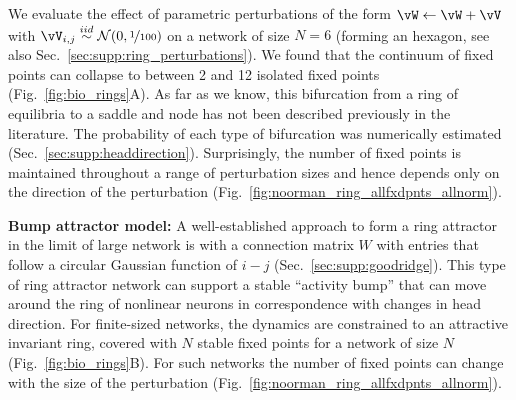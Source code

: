 \documentclass{article} %
\newcommand{\ptitle}[1]{\textbf{#1:}\xspace}
\newcounter{ct}
\newcommand{\iidsample}{\stackrel{iid}{\sim}}
\theoremstyle{definition}
\theoremstyle{remark}
\begin{document}
We evaluate the effect of parametric perturbations of the form \( \vW \leftarrow \vW + \vV\) with \(\vV_{i, j}\iidsample\mathcal{N}(0,\nicefrac{1}{100})\) on a network of size \(N = 6\) (forming an hexagon, see also Sec.~\ref{sec:supp:ring_perturbations}). %
We found that the continuum of fixed points can collapse to between 2 and 12 isolated fixed points (Fig.~\ref{fig:bio_rings}A).
As far as we know, this bifurcation from a ring of equilibria to a saddle and node has not been described previously in the literature.
The probability of each type of bifurcation was numerically estimated (Sec.~\ref{sec:supp:headdirection}).
Surprisingly, the number of fixed points is maintained throughout a range of perturbation sizes and hence depends only on the direction of the perturbation (Fig.~\ref{fig:noorman_ring_allfxdpnts_allnorm}).


\ptitle{Bump attractor model}
A well-established approach to form a ring attractor in the limit of large network is with a connection matrix \(W\) with entries that follow a circular Gaussian function of \(i - j\)\citep{seeholzer2017efficient,redish1996coupled,goodridge2000,compte2000synaptic} (Sec.~\ref{sec:supp:goodridge}).
This type of ring attractor network can support a stable ``activity bump'' that can move around the ring of nonlinear neurons in correspondence with changes in head direction\citep{kakaria2017}.
For finite-sized networks, the dynamics are constrained to an attractive invariant ring, covered with \(N\) stable fixed points for a network of size \(N\) (Fig.~\ref{fig:bio_rings}B).
For such networks the number of fixed points can change with the size of the perturbation (Fig.~\ref{fig:noorman_ring_allfxdpnts_allnorm}).
\end{document}
